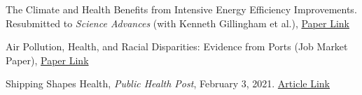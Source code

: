 
\begin{pubitems} %
    \item {The Climate and Health Benefits from Intensive Energy Efficiency Improvements. Resubmitted to \textit{Science Advances} (with Kenneth Gillingham et al.), \href{https://www.dropbox.com/s/w2jearj41mr0hkq/building_EE_v18.docx?dl=0}{Paper Link}}
    \item {Air Pollution, Health, and Racial Disparities: Evidence from Ports (Job Market Paper), \href{https://www.dropbox.com/s/7id1zrggt80zp5j/Huang_PortHealth.pdf?dl=0}{Paper Link}}
\end{pubitems}




\begin{pubitems} %
    \item {Shipping Shapes Health, \textit{Public Health Post}, February 3, 2021. \href{https://www.publichealthpost.org/research/shipping-shapes-health/}{Article Link}}
\end{pubitems}

